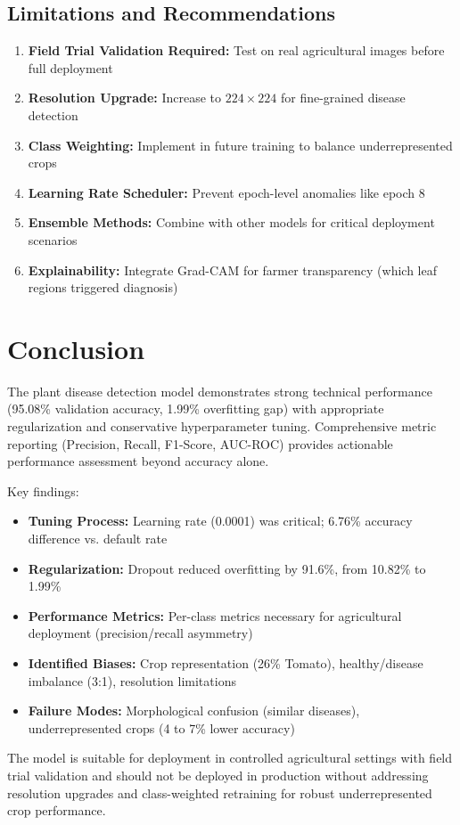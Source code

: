 \documentclass[11pt,a4paper]{article}
\begin{document}
\subsection{Limitations and Recommendations}

\begin{enumerate}
    \item \textbf{Field Trial Validation Required:} Test on real agricultural images before full deployment
    \item \textbf{Resolution Upgrade:} Increase to $224 \times 224$ for fine-grained disease detection
    \item \textbf{Class Weighting:} Implement in future training to balance underrepresented crops
    \item \textbf{Learning Rate Scheduler:} Prevent epoch-level anomalies like epoch 8
    \item \textbf{Ensemble Methods:} Combine with other models for critical deployment scenarios
    \item \textbf{Explainability:} Integrate Grad-CAM for farmer transparency (which leaf regions triggered diagnosis)
\end{enumerate}

\newpage

\section{Conclusion}

The plant disease detection model demonstrates strong technical performance (95.08\% validation accuracy, 1.99\% overfitting gap) with appropriate regularization and conservative hyperparameter tuning. Comprehensive metric reporting (Precision, Recall, F1-Score, AUC-ROC) provides actionable performance assessment beyond accuracy alone.

Key findings:
\begin{itemize}
    \item \textbf{Tuning Process:} Learning rate (0.0001) was critical; 6.76\% accuracy difference vs. default rate
    \item \textbf{Regularization:} Dropout reduced overfitting by 91.6\%, from 10.82\% to 1.99\%
    \item \textbf{Performance Metrics:} Per-class metrics necessary for agricultural deployment (precision/recall asymmetry)
    \item \textbf{Identified Biases:} Crop representation (26\% Tomato), healthy/disease imbalance (3:1), resolution limitations
    \item \textbf{Failure Modes:} Morphological confusion (similar diseases), underrepresented crops (4 to 7\% lower accuracy)
\end{itemize}

The model is suitable for deployment in controlled agricultural settings with field trial validation and should not be deployed in production without addressing resolution upgrades and class-weighted retraining for robust underrepresented crop performance.
\end{document}
